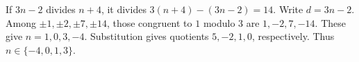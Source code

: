 If $3n-2$ divides $n+4$, it divides $3(n+4)-(3n-2)=14$. Write $d=3n-2$. Among $\pm 1,\pm 2,\pm 7,\pm 14$, those congruent to $1$ modulo $3$ are $1,-2,7,-14$. These give $n=1,0,3,-4$. Substitution gives quotients $5,-2,1,0$, respectively. Thus $\boxed{n\in\{-4,0,1,3\}}$.
